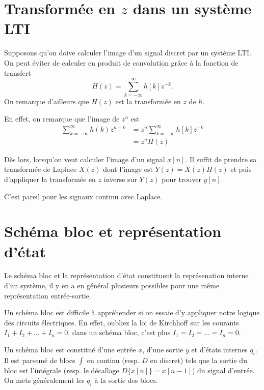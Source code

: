 
\section{Transformée en $z$ dans un système LTI}
Supposons qu'on doive calculer l'image d'un signal discret par un système LTI.
On peut éviter de calculer en produit de convolution grâce à la fonction
de transfert
\[ H(z) = \sum_{k=-\infty}^{\infty} h[k] z^{-k}. \]
On remarque d'ailleurs que $H(z)$ est la transformée en $z$ de $h$.

En effet, on remarque que l'image de $z^n$ est
\begin{align*}
  \sum_{k=-\infty}^{\infty} h(k) z^{n-k} &
  = z^{n} \sum_{k=-\infty}^{\infty} h[k] z^{-k}\\
  & = z^n H(z)
\end{align*}

Dès lors, lorsqu'on veut calculer l'image d'un signal $x[n]$. Il suffit de
prendre sa transformée de Laplace $X(z)$ dont l'image est $Y(z) = X(z) H(z)$
et puis d'appliquer la transformée en $z$ inverse sur $Y(z)$ pour trouver
$y[n]$.

C'est pareil pour les signaux continu avec Laplace.

\section{Schéma bloc et représentation d'état}
Le schéma bloc et la représentation d'état constituent la représenation
interne d'un système, il y en a en général plusieurs possibles pour une
même représentation entrée-sortie.

Un schéma bloc est difficile à appréhender si on essaie d'y appliquer
notre logique des circuits électriques.
En effet, oubliez la loi de Kirchhoff sur les courants
$I_1 + I_2 + \ldots + I_n = 0$, dans un schéma bloc, c'est plus
$I_1 = I_2 = \ldots = I_n = 0$.

Un schéma bloc est constitué d'une entrée $x$, d'une sortie $y$ et
d'états internes $q_i$.
Il est parsemé de blocs $\int$ en continu (resp. $D$ en discret) tels que
la sortie du bloc est l'intégrale (resp. le décallage $D\{x[n]\} = x[n-1]$) du
signal d'entrée.
On mets généralement les $q_i$ à la sortie des blocs.


